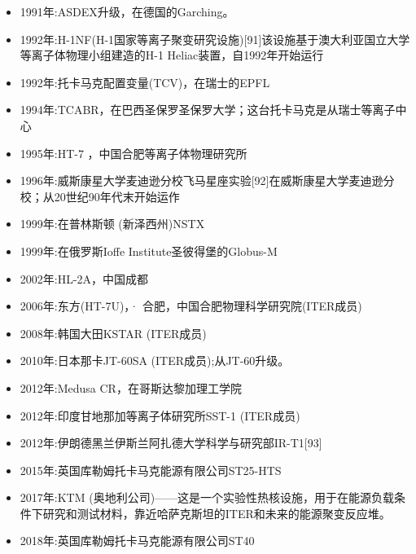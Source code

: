 \begin{itemize}
\item 1991年:ASDEX升级，在德国的Garching。
\item 1992年:H-1NF(H-1国家等离子聚变研究设施)[91]该设施基于澳大利亚国立大学等离子体物理小组建造的H-1 Heliac装置，自1992年开始运行
\item 1992年:托卡马克配置变量(TCV)，在瑞士的EPFL
\item 1994年:TCABR，在巴西圣保罗圣保罗大学；这台托卡马克是从瑞士等离子中心
\item 1995年:HT-7 ，中国合肥等离子体物理研究所
\item 1996年:威斯康星大学麦迪逊分校飞马星座实验[92]在威斯康星大学麦迪逊分校；从20世纪90年代末开始运作
\item 1999年:在普林斯顿 (新泽西州)NSTX
\item 1999年:在俄罗斯Ioffe Institute圣彼得堡的Globus-M
\item 2002年:HL-2A，中国成都
\item 2006年:东方(HT-7U)，·        合肥，中国合肥物理科学研究院(ITER成员)
\item 2008年:韩国大田KSTAR (ITER成员)
\item 2010年:日本那卡JT-60SA (ITER成员);从JT-60升级。
\item 2012年:Medusa CR，在哥斯达黎加理工学院
\item 2012年:印度甘地那加等离子体研究所SST-1 (ITER成员)
\item 2012年:伊朗德黑兰伊斯兰阿扎德大学科学与研究部IR-T1[93]
\item 2015年:英国库勒姆托卡马克能源有限公司ST25-HTS
\item 2017年:KTM (奥地利公司)——这是一个实验性热核设施，用于在能源负载条件下研究和测试材料，靠近哈萨克斯坦的ITER和未来的能源聚变反应堆。
\item 2018年:英国库勒姆托卡马克能源有限公司ST40
\end{itemize}
